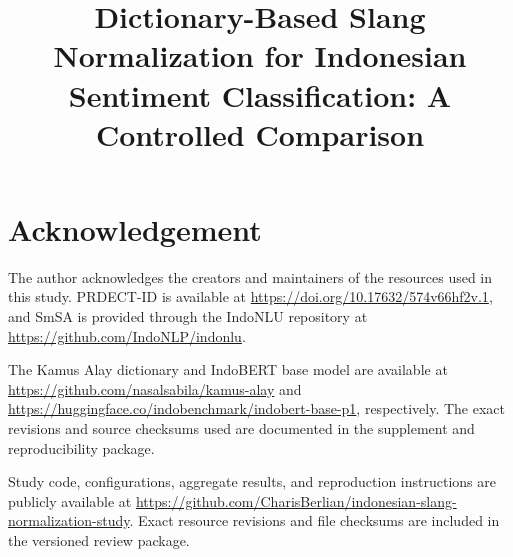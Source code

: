 \documentclass[conference]{IEEEtran}
\begin{document}
\title{Dictionary-Based Slang Normalization for Indonesian Sentiment Classification: A Controlled Comparison}
\author{
}
\maketitle
{}







\section*{Acknowledgement}
The author acknowledges the creators and maintainers of the resources used in this study. PRDECT-ID is available at \url{https://doi.org/10.17632/574v66hf2v.1}, and SmSA is provided through the IndoNLU repository at \url{https://github.com/IndoNLP/indonlu}.

The Kamus Alay dictionary and IndoBERT base model are available at \url{https://github.com/nasalsabila/kamus-alay} and \url{https://huggingface.co/indobenchmark/indobert-base-p1}, respectively. The exact revisions and source checksums used are documented in the supplement and reproducibility package.

Study code, configurations, aggregate results, and reproduction instructions are publicly available at \url{https://github.com/CharisBerlian/indonesian-slang-normalization-study}. Exact resource revisions and file checksums are included in the versioned review package.


\end{document}
